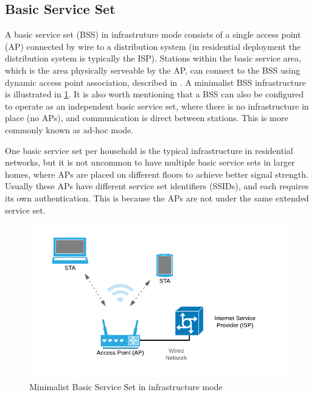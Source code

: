 		\subsection{Basic Service Set}
		A basic service set (BSS) in infrastruture mode consists of a single access point (AP) connected by wire to a distribution system (in residential deployment the distribution system is typically the ISP).
		Stations within the basic service area, which is the area physically serveable by the AP, can connect to the BSS using dynamic access point association, described
		in \cite{std80211}. A minimalist BSS infrastructure is illustrated in \ref{fig:basicserviceset}. It is also worth mentioning that a BSS can also be configured to operate as an independent
		basic service set, where there is no infrastructure in place (no APs), and communication is direct between stations. This is more commonly known as ad-hoc mode.
		
		One basic service set per household is the typical infrastructure in residential networks, but it is not uncommon to have multiple basic service sets in larger homes,
		where APs are placed on different floors to achieve better signal strength. Usually these APs have different service set identifiers (SSIDs), and each requires its own authentication.
		This is because the APs are not under the same extended service set. 

		 \begin{figure}
			 \center
			 \includegraphics[scale=0.35]{Images/BSS.png}
			 \caption{Minimalist Basic Service Set in infrastructure mode}
			 \label{fig:basicserviceset}
		 \end{figure}

